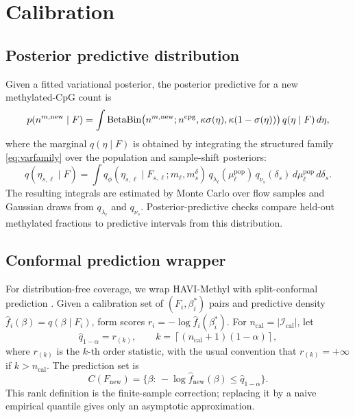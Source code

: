 \section{Calibration}
\label{sec:calibration}

\subsection{Posterior predictive distribution}
Given a fitted variational posterior, the posterior predictive for a new methylated-CpG count is
\begin{equation}
p(n^{m,\mathrm{new}}\mid F) = \int \mathrm{BetaBin}\big(n^{m,\mathrm{new}};n^{\mathrm{cpg}},\kappa\sigma(\eta),\kappa(1-\sigma(\eta))\big)\,q(\eta\mid F)\,d\eta,
\end{equation}
where the marginal $q(\eta\mid F)$ is obtained by integrating the structured family \eqref{eq:varfamily} over the population and sample-shift posteriors:
\begin{equation}
q(\eta_{s,\ell}\mid F) = \int q_\phi(\eta_{s,\ell}\mid F_{s,\ell};m_\ell,m_s^\delta)\,q_{\lambda_\ell}(\mu^{\mathrm{pop}}_\ell)\,q_{\nu_s}(\delta_s)\,d\mu^{\mathrm{pop}}_\ell\,d\delta_s.
\end{equation}
The resulting integrals are estimated by Monte Carlo over flow samples and Gaussian draws from $q_{\lambda_\ell}$ and $q_{\nu_s}$. Posterior-predictive checks compare held-out methylated fractions to predictive intervals from this distribution.

\subsection{Conformal prediction wrapper}
For distribution-free coverage, we wrap HAVI-Methyl with split-conformal prediction \citep{vovk2005,lei2018conformal}. Given a calibration set of $(F_i,\beta^*_i)$ pairs and predictive density $\hat f_i(\beta)=q(\beta\mid F_i)$, form scores $r_i=-\log \hat f_i(\beta^*_i)$. For $n_{\mathrm{cal}}=|\mathcal{I}_{\mathrm{cal}}|$, let
\begin{equation}
\hat q_{1-\alpha}=r_{(k)},\qquad k=\left\lceil (n_{\mathrm{cal}}+1)(1-\alpha)\right\rceil,
\label{eq:conformal-rank}
\end{equation}
where $r_{(k)}$ is the $k$-th order statistic, with the usual convention that $r_{(k)}=+\infty$ if $k>n_{\mathrm{cal}}$. The prediction set is
\begin{equation}
C(F_{\mathrm{new}}) = \{\beta:\,-\log\hat f_{\mathrm{new}}(\beta)\le \hat q_{1-\alpha}\}.
\end{equation}
This rank definition is the finite-sample correction; replacing it by a naive empirical quantile gives only an asymptotic approximation.

